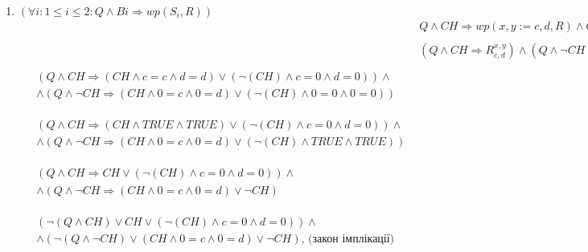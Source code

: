 \documentclass[14pt,a4paper]{extarticle}
\theoremstyle{definition}
\begin{document}
\begin{enumerate}
  \item $(\forall i: 1 \leq i \leq 2: Q \land Bi \Rightarrow
  \mathit{wp}(S_i, R))$
  \begin{align*}
    &Q \land CH \Rightarrow  \mathit{wp}(x,y := c,d,R)
      \land Q \land \lnot CH \Rightarrow \mathit{wp}(x,y := 0,0,R))\\\\
    &(Q \land CH \Rightarrow R_{c,d}^{x,y})
      \land (Q \land \lnot CH \Rightarrow R_{0,0}^{x,y})
      \text{, (за озн. присвоювання)} \\\\
    \begin{split}
      &(Q \land CH \Rightarrow (CH \land c = c \land d = d)
        \lor (\lnot(CH) \land c = 0 \land d = 0)) \land \\
      &\land (Q \land \lnot CH \Rightarrow (CH \land 0 = c \land 0 = d)
        \lor (\lnot(CH) \land 0 = 0 \land 0 = 0)) \\
    \end{split}\\\\
    \begin{split}
      &(Q \land CH \Rightarrow (CH \land TRUE \land TRUE)
        \lor (\lnot(CH) \land c = 0 \land d = 0)) \land \\
      &\land (Q \land \lnot CH \Rightarrow (CH \land 0 = c \land 0 = d)
        \lor (\lnot(CH) \land TRUE \land TRUE)) \\
    \end{split}\\\\
    \begin{split}
      &(Q \land CH \Rightarrow CH
        \lor (\lnot(CH) \land c = 0 \land d = 0)) \land \\
      &\land (Q \land \lnot CH \Rightarrow (CH \land 0 = c \land 0 = d)
        \lor \lnot CH) \\
    \end{split}\\\\
    \begin{split}
      &(\lnot(Q \land CH) \lor CH
        \lor (\lnot(CH) \land c = 0 \land d = 0)) \land \\
      &\land (\lnot(Q \land \lnot CH) \lor (CH \land 0 = c \land 0 = d)
        \lor \lnot CH) \text{, (закон імплікації)} \\
    \end{split}\\\\

\end{align*}
\end{enumerate}
\end{document}
